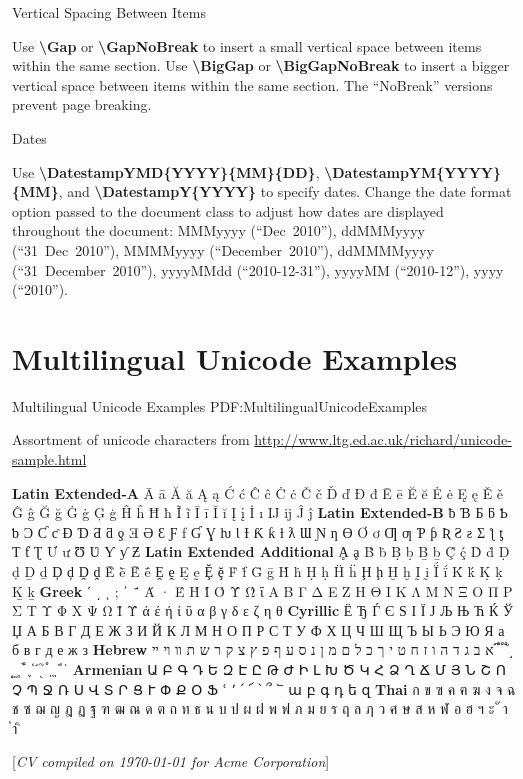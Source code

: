 \documentclass[letterpaper,MMMyyyy,nonstop]{simpleresumecv}
\newcommand{\CVNote}{CV compiled on {\today} for Acme Corporation}
\newcommand{\CodeCommand}[1]{\mbox{\textbf{\textbackslash{#1}}}}
\begin{document}
\begin{body}
\Gap
\BulletItem
Vertical Spacing Between Items
\begin{detail}
\SubBulletItem
Use \CodeCommand{Gap} or \CodeCommand{GapNoBreak} to insert a small vertical space between items within the same section.
\SubBulletItem
Use \CodeCommand{BigGap} or \CodeCommand{BigGapNoBreak} to insert a bigger vertical space between items within the same section.
\SubBulletItem
The ``NoBreak'' versions prevent page breaking.
\end{detail}

\Gap
\BulletItem
Dates
\begin{detail}
\SubBulletItem
Use
\CodeCommand{DatestampYMD\{YYYY\}\{MM\}\{DD\}},
\CodeCommand{DatestampYM\{YYYY\}\{MM\}}, and
\CodeCommand{DatestampY\{YYYY\}}
to specify dates.
\SubBulletItem
Change the date format option passed to the document class to adjust how dates are displayed throughout the document:
MMMyyyy (``Dec~2010''),
ddMMMyyyy (``31~Dec~2010''),
MMMMyyyy (``December~2010''),
ddMMMMyyyy (``31~December~2010''),
yyyyMMdd (``2010-12-31''),
yyyyMM (``2010-12''),
yyyy (``2010'').
\end{detail}


\section
{Multilingual Unicode Examples}
{Multilingual Unicode Examples}
{PDF:MultilingualUnicodeExamples}

\BulletItem
Assortment of unicode characters from
\href{http://www.ltg.ed.ac.uk/~richard/unicode-sample.html}
{http://www.ltg.ed.ac.uk/{\TildeSymbol}richard/unicode-sample.html}

\begin{detail}
\SubItem
\textbf{Latin Extended-A}
Ā ā Ă ă Ą ą Ć ć Ĉ ĉ Ċ ċ Č č Ď ď Đ đ Ē ē Ĕ ĕ Ė ė Ę ę Ě ě Ĝ ĝ Ğ ğ Ġ ġ Ģ ģ Ĥ ĥ Ħ ħ Ĩ ĩ Ī ī Ĭ ĭ Į į İ ı Ĳ ĳ Ĵ ĵ
\textbf{Latin Extended-B}
ƀ Ɓ Ƃ ƃ Ƅ ƅ Ɔ Ƈ ƈ Ɖ Ɗ Ƌ ƌ ƍ Ǝ Ə Ɛ Ƒ ƒ Ɠ Ɣ ƕ Ɩ Ɨ Ƙ ƙ ƚ ƛ Ɯ Ɲ ƞ Ɵ Ơ ơ Ƣ ƣ Ƥ ƥ Ʀ Ƨ ƨ Ʃ ƪ ƫ Ƭ ƭ Ʈ Ư ư Ʊ Ʋ Ƴ ƴ Ƶ
\textbf{Latin Extended Additional}
Ḁ ḁ Ḃ ḃ Ḅ ḅ Ḇ ḇ Ḉ ḉ Ḋ ḋ Ḍ ḍ Ḏ ḏ Ḑ ḑ Ḓ ḓ Ḕ ḕ Ḗ ḗ Ḙ ḙ Ḛ ḛ Ḝ ḝ Ḟ ḟ Ḡ ḡ Ḣ ḣ Ḥ ḥ Ḧ ḧ Ḩ ḩ Ḫ ḫ Ḭ ḭ Ḯ ḯ Ḱ ḱ Ḳ ḳ Ḵ ḵ
\textbf{Greek}
ʹ ͵ ͺ ; ΄ ΅ Ά · Έ Ή Ί Ό Ύ Ώ ΐ Α Β Γ Δ Ε Ζ Η Θ Ι Κ Λ Μ Ν Ξ Ο Π Ρ Σ Τ Υ Φ Χ Ψ Ω Ϊ Ϋ ά έ ή ί ΰ α β γ δ ε ζ η θ
\textbf{Cyrillic}
Ё Ђ Ѓ Є Ѕ І Ї Ј Љ Њ Ћ Ќ Ў Џ А Б В Г Д Е Ж З И Й К Л М Н О П Р С Т У Ф Х Ц Ч Ш Щ Ъ Ы Ь Э Ю Я а б в г д е ж з
\textbf{Hebrew}
א ב ג ד ה ו ז ח ט י ך כ ל ם מ ן נ ס ע ף פ ץ צ ק ר ש ת װ ױ ײ ֝ ֞ ֟ ֠ ֡ ֣ ֤ ֥ ֦ ֧ ֨ ֩ ֪ ֫ ֬ ֭ ֮ ֯ ְ ֱ ֒ ֓ ֔
\textbf{Armenian}
{\UseSecondaryFont
Ա Բ Գ Դ Ե Զ Է Ը Թ Ժ Ի Լ Խ Ծ Կ Հ Ձ Ղ Ճ Մ Յ Ն Շ Ո Չ Պ Ջ Ռ Ս Վ Տ Ր Ց Ւ Փ Ք Օ Ֆ ՙ ՚ ՛ ՜ ՝ ՞ ՟ ա բ գ դ ե զ}
\textbf{Thai}
{\UseSecondaryFont
ก ข ฃ ค ฅ ฆ ง จ ฉ ช ซ ฌ ญ ฎ ฏ ฐ ฑ ฒ ณ ด ต ถ ท ธ น บ ป ผ ฝ พ ฟ ภ ม ย ร ฤ ล ฦ ว ศ ษ ส ห ฬ อ ฮ ฯ ะ ั า ำ ิ}
\end{detail}

\end{body}


\UseNoteFont%
\null\hfill%
[\textit{\CVNote}]%
\hspace{2.0mm}\null
\end{document}
